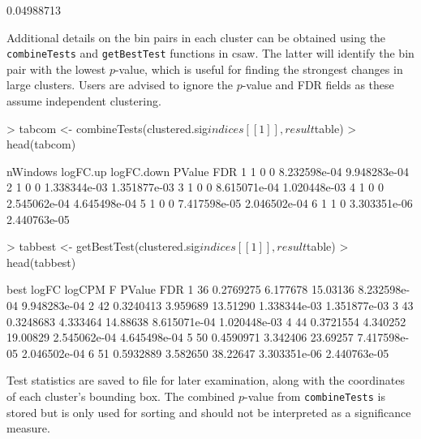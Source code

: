 \documentclass[12pt]{report}
\renewenvironment{Schunk}{\vspace{0pt}}{\vspace{0pt}}
\newcommand{\csaw}{csaw}
\newcommand{\code}[1]{{\small\texttt{#1}}}
\begin{document}
\begin{Schunk}
\begin{Soutput}
[1] 0.04988713
\end{Soutput}
\end{Schunk}

Additional details on the bin pairs in each cluster can be obtained using the \code{combineTests} and \code{getBestTest} functions in \csaw{}.
The latter will identify the bin pair with the lowest $p$-value, which is useful for finding the strongest changes in large clusters.
Users are advised to ignore the $p$-value and FDR fields as these assume independent clustering.

\begin{Schunk}
\begin{Sinput}
> tabcom <- combineTests(clustered.sig$indices[[1]], result$table)
> head(tabcom)
\end{Sinput}
\begin{Soutput}
  nWindows logFC.up logFC.down       PValue          FDR
1        1        0          0 8.232598e-04 9.948283e-04
2        1        0          0 1.338344e-03 1.351877e-03
3        1        0          0 8.615071e-04 1.020448e-03
4        1        0          0 2.545062e-04 4.645498e-04
5        1        0          0 7.417598e-05 2.046502e-04
6        1        1          0 3.303351e-06 2.440763e-05
\end{Soutput}
\begin{Sinput}
> tabbest <- getBestTest(clustered.sig$indices[[1]], result$table)
> head(tabbest)
\end{Sinput}
\begin{Soutput}
  best     logFC   logCPM        F       PValue          FDR
1   36 0.2769275 6.177678 15.03136 8.232598e-04 9.948283e-04
2   42 0.3240413 3.959689 13.51290 1.338344e-03 1.351877e-03
3   43 0.3248683 4.333464 14.88638 8.615071e-04 1.020448e-03
4   44 0.3721554 4.340252 19.00829 2.545062e-04 4.645498e-04
5   50 0.4590971 3.342406 23.69257 7.417598e-05 2.046502e-04
6   51 0.5932889 3.582650 38.22647 3.303351e-06 2.440763e-05
\end{Soutput}
\end{Schunk}

Test statistics are saved to file for later examination, along with the coordinates of each cluster's bounding box.
The combined $p$-value from \code{combineTests} is stored but is only used for sorting and should not be interpreted as a significance measure.
\end{document}
